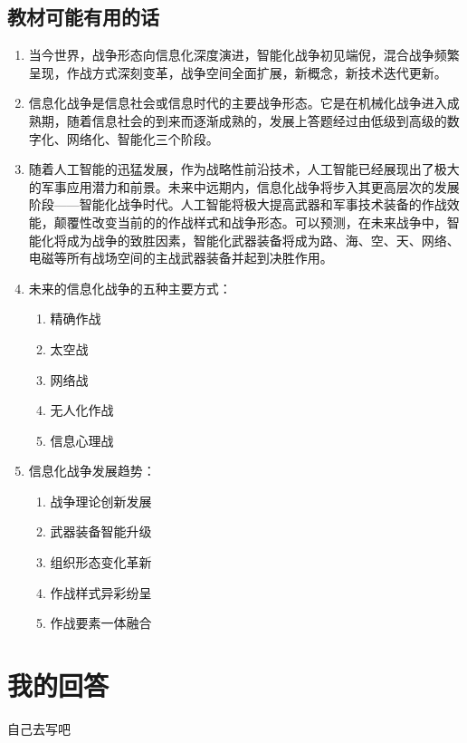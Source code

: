 \documentclass[lang=cn,newtx,12pt,scheme=chinese]{elegantbook}
\begin{document}
\subsection{教材可能有用的话}
\begin{enumerate}
  \item 当今世界，战争形态向信息化深度演进，智能化战争初见端倪，混合战争频繁呈现，作战方式深刻变革，战争空间全面扩展，新概念，新技术迭代更新。
  \item 信息化战争是信息社会或信息时代的主要战争形态。它是在机械化战争进入成熟期，随着信息社会的到来而逐渐成熟的，发展上答题经过由低级到高级的数字化、网络化、智能化三个阶段。 
  \item 随着人工智能的迅猛发展，作为战略性前沿技术，人工智能已经展现出了极大的军事应用潜力和前景。未来中远期内，信息化战争将步入其更高层次的发展阶段——智能化战争时代。人工智能将极大提高武器和军事技术装备的作战效能，颠覆性改变当前的的作战样式和战争形态。可以预测，在未来战争中，智能化将成为战争的致胜因素，智能化武器装备将成为路、海、空、天、网络、电磁等所有战场空间的主战武器装备并起到决胜作用。
  \item 未来的信息化战争的五种主要方式：\label{def:信息战的方式}
    \begin{enumerate}
      \item 精确作战
      \item 太空战
      \item 网络战  
      \item 无人化作战
      \item 信息心理战
    \end{enumerate}
  \item 信息化战争发展趋势：
    \begin{enumerate}
      \item 战争理论创新发展
      \item 武器装备智能升级
      \item 组织形态变化革新
      \item 作战样式异彩纷呈
      \item 作战要素一体融合
    \end{enumerate}
\end{enumerate}

\section{我的回答}
自己去写吧
\end{document}
